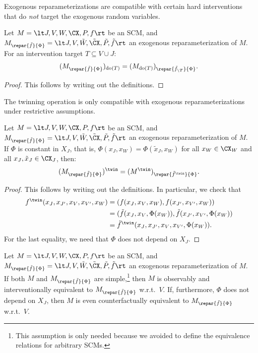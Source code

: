 Exogenous reparameterizations are compatible with certain hard interventions that do \emph{not} target the exogenous random variables.
\begin{Lem}\label{lem:interventions_exogenous_reparameterization_commute}
Let $M = \lt J, V, W, \CX, P, f \rt$ be an SCM, and $M_{\repar{\tilde{f}}{\Phi}} = \lt J, V, \tilde{W}, \tilde{\CX}, \tilde{P}, \tilde{f} \rt$ an exogenous reparameterization of $M$.
For an intervention target $T \subseteq V \cup J$:
$$(M_{\repar{\tilde{f}}{\Phi}})_{\doit(T)} = (M_{\doit(T)})_{\repar{\tilde{f}_{\sm T}}{\Phi}}.$$
\end{Lem}
\begin{proof}
  This follows by writing out the definitions.
\end{proof}
The twinning operation is only compatible with exogenous reparameterizations under restrictive assumptions.
\begin{Lem}\label{lem:twinning_exogenous_reparameterization_commute}
Let $M = \lt J, V, W, \CX, P, f \rt$ be an SCM, and $M_{\repar{\tilde{f}}{\Phi}} = \lt J, V, \tilde{W}, \tilde{\CX}, \tilde{P}, \tilde{f} \rt$ an exogenous reparameterization of $M$.
If $\Phi$ is constant in $X_J$, that is, $\Phi(x_J,x_W) = \Phi(\tilde{x}_J,x_W)$ for all $x_W \in \CX_W$ and all $x_J,\tilde{x}_J \in \CX_J$, then:
$$(M_{\repar{\tilde{f}}{\Phi}})^\twin = (M^\twin)_{\repar{\tilde{f}^\twin}{\Phi}}.$$
\end{Lem}
\begin{proof}
  This follows by writing out the definitions. In particular, we check that
  \begin{equation*}\begin{split}
    f^\twin(x_J,x_{J'},x_V,x_{V'},x_W) 
    & = (f(x_J,x_V,x_W),f(x_{J'},x_{V'},x_W)) \\
    & = (\tilde{f}(x_J,x_V,\Phi(x_W)),\tilde{f}(x_{J'},x_{V'},\Phi(x_W)) \\
    & = \tilde{f}^{\twin}(x_J,x_{J'},x_V,x_{V'},\Phi(x_W)).
  \end{split}\end{equation*}
  For the last equality, we need that $\Phi$ does not depend on $X_J$.
\end{proof}
\begin{Thm}\label{thm:various_equiv_exogenous_reparameterization}
  Let $M = \lt J, V, W, \CX, P, f \rt$ be an SCM, and $M_{\repar{\tilde{f}}{\Phi}} = \lt J, V, \tilde{W}, \tilde{\CX}, \tilde{P}, \tilde{f} \rt$ an exogenous reparameterization of $M$.
  If both $M$ and $M_{\repar{\tilde{f}}{\Phi}}$ are simple,\footnote{This assumption is only needed because we avoided to define the equivalence relations for arbitrary SCMs.}
  then $M$ is observably and interventionally equivalent to $M_{\repar{\tilde{f}}{\Phi}}$ w.r.t.\ $V$.
  If, furthermore, $\Phi$ does not depend on $X_J$, then $M$ is even counterfactually equivalent to $M_{\repar{\tilde{f}}{\Phi}}$ w.r.t.\ $V$.
\end{Thm}
